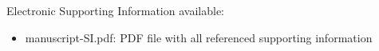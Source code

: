 


\begin{acknowledgement}
\end{acknowledgement}


\begin{suppinfo}

    Electronic Supporting Information available:
    \begin{itemize}
      \item manuscript-SI.pdf: PDF file with all referenced supporting information
    \end{itemize}
    
\end{suppinfo}